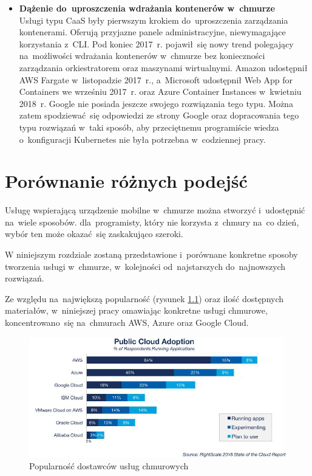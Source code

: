 \documentclass[12pt,a4paper,twoside,titlepage,openright]{book}
\begin{document}
\begin{itemize}
\item \textbf{Dążenie do~uproszczenia wdrażania kontenerów w~chmurze} \\
Usługi typu CaaS były pierwszym krokiem do~uproszczenia zarządzania kontenerami. Oferują przyjazne panele administracyjne, niewymagające korzystania z~CLI. Pod koniec 2017~r. pojawił~się nowy trend polegający na~możliwości wdrażania kontenerów w~chmurze bez konieczności zarządzania orkiestratorem oraz maszynami wirtualnymi. Amazon udostępnił AWS Fargate w~listopadzie 2017~r.,\cite{siteAwsFargateIntroducing} a~Microsoft udostępnił Web App for Containers we wrześniu 2017~r.\cite{siteAzureWebAppContainersAvailable} oraz Azure Container Instances w~kwietniu 2018~r.\cite{siteAzureContainerInstancesIntroducing} Google nie posiada jeszcze swojego rozwiązania tego typu. Można zatem spodziewać~się odpowiedzi ze strony Google oraz dopracowania tego typu rozwiązań w~taki sposób, aby przeciętnemu programiście wiedza o~konfiguracji Kubernetes nie była potrzebna w~codziennej pracy.

\end{itemize}

\chapter{Porównanie różnych podejść}

Usługę wspierającą urządzenie mobilne w~chmurze można stworzyć i~udostępnić na~wiele sposobów. dla~programisty, który nie korzysta z~chmury na~co dzień, wybór ten może okazać~się zaskakująco szeroki.

W niniejszym rozdziale zostaną przedstawione i~porównane konkretne sposoby tworzenia usługi w~chmurze, w~kolejności od~najstarszych do~najnowszych rozwiązań.

Ze względu na~największą popularność (rysunek \ref{fig:popularnosc}) oraz ilość dostępnych materiałów, w~niniejszej pracy omawiając konkretne usługi chmurowe, koncentrowano~się na~chmurach AWS, Azure oraz Google Cloud.

\begin{figure}[h]
	\centering
			\includegraphics[width=\textwidth]{popularnosc.png}
		\caption{Popularność dostawców usług chmurowych \cite{rightscaleReport}}
		\label{fig:popularnosc}
\end{figure}
\end{document}
